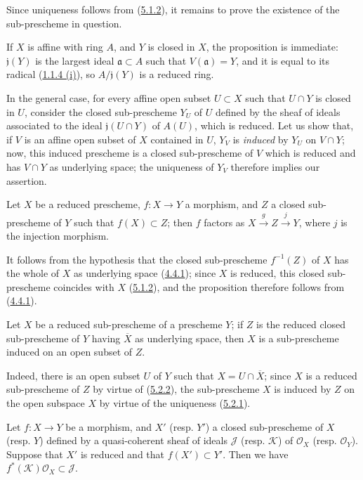 Since uniqueness follows from (\hyperref[I.5.1.2]{5.1.2}), it remains to
prove the existence of the sub-prescheme in question.

If $X$ is affine with ring $A$, and $Y$ is closed in $X$, the proposition is
immediate: $\mathfrak{j}(Y)$ is the largest ideal
$\mathfrak{a}\subset A$ such that $V(\mathfrak{a})=Y$, and it is equal to its
radical (\hyperref[I.1.1.4]{1.1.4 (i)}), so
$A/\mathfrak{j}(Y)$ is a reduced ring.

In the general case, for every affine open subset $U\subset X$ such that
$U\cap Y$ is closed in $U$, consider the closed sub-prescheme $Y_U$ of $U$
defined by the sheaf of ideals associated to the ideal $\mathfrak{j}(U\cap Y)$
of $A(U)$, which is reduced. Let us show that, if $V$ is an affine open
subset of $X$ contained in $U$, $Y_V$ is \emph{induced} by $Y_U$ on
$V\cap Y$; now, this induced prescheme is a closed sub-prescheme of $V$ which
is reduced and has $V\cap Y$ as underlying space; the uniqueness of $Y_V$
therefore implies our assertion.

\begin{proposition}[5.2.2]
\label{I.5.2.2}
Let $X$ be a reduced prescheme, $f:X\to Y$ a morphism, and $Z$ a closed
sub-prescheme of $Y$ such that $f(X)\subset Z$; then $f$ factors
as $X\xrightarrow{g}Z\xrightarrow{j}Y$, where $j$ is the injection morphism.
\end{proposition}

It follows from the hypothesis that the closed sub-prescheme $f^{-1}(Z)$ of
$X$ has the whole of $X$ as underlying space
(\hyperref[I.4.4.1]{4.4.1}); since $X$ is reduced, this closed
sub-prescheme coincides with $X$ (\hyperref[I.5.1.2]{5.1.2}), and the
proposition therefore follows from (\hyperref[I.4.4.1]{4.4.1}).

\begin{corollary}[5.2.3]
\label{I.5.2.3}
Let $X$ be a reduced sub-prescheme of a prescheme $Y$; if $Z$ is the
reduced closed sub-prescheme of $Y$ having $\overline{X}$ as underlying
space, then $X$ is a sub-prescheme induced on an open subset of $Z$.
\end{corollary}

Indeed, there is an open subset $U$ of $Y$ such that
$X=U\cap\overline{X}$; since $X$ is a reduced sub-prescheme of $Z$ by
virtue of (\hyperref[I.5.2.2]{5.2.2}), the sub-prescheme $X$ is induced by
$Z$ on the open subspace $X$ by virtue of the uniqueness
(\hyperref[I.5.2.1]{5.2.1}).

\begin{corollary}[5.2.4]
\label{I.5.2.4}
Let $f:X\to Y$ be a morphism, and $X'$ (resp. $Y'$) a closed sub-prescheme of
$X$ (resp. $Y$) defined by a quasi-coherent sheaf of ideals $\mathscr{J}$
(resp. $\mathscr{K}$) of $\mathscr{O}_X$ (resp. $\mathscr{O}_Y$). Suppose
that $X'$ is reduced and that $f(X')\subset Y'$. Then we have
$f^*(\mathscr{K})\mathscr{O}_X\subset\mathscr{J}$.
\end{corollary}

